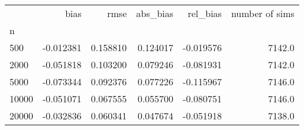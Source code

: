 \begin{tabular}{lrrrrr}
\toprule
{} &      bias &      rmse &  abs_bias &  rel_bias &  number of sims \\
n     &           &           &           &           &                 \\
\midrule
500   & -0.012381 &  0.158810 &  0.124017 & -0.019576 &          7142.0 \\
2000  & -0.051818 &  0.103200 &  0.079246 & -0.081931 &          7142.0 \\
5000  & -0.073344 &  0.092376 &  0.077226 & -0.115967 &          7146.0 \\
10000 & -0.051071 &  0.067555 &  0.055700 & -0.080751 &          7146.0 \\
20000 & -0.032836 &  0.060341 &  0.047674 & -0.051918 &          7138.0 \\
\bottomrule
\end{tabular}
